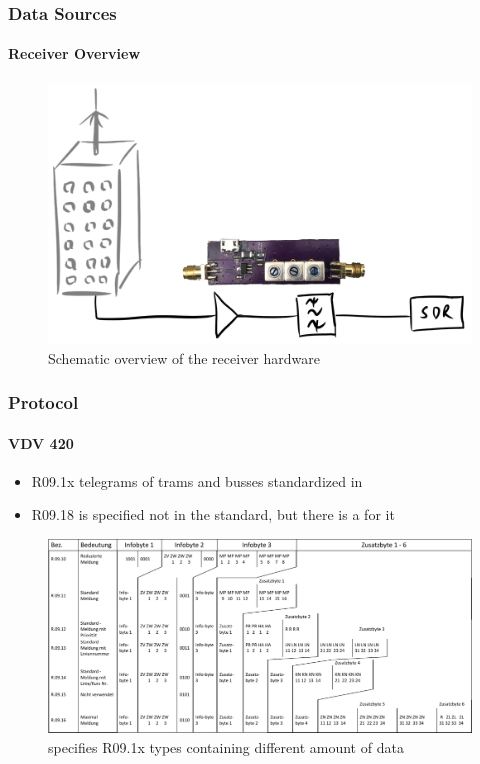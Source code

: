 
\begin{frame}
\frametitle{Data Sources}
\framesubtitle{Receiver Overview}
\begin{figure}
\centering
\includegraphics[height=0.65\textheight]{figs/antenna-filter.pdf}
\caption{Schematic overview of the receiver hardware}
\end{figure}
\end{frame}


\begin{frame}
\frametitle{Protocol}
\framesubtitle{VDV 420}
	\begin{itemize}
		\item R09.1x telegrams of trams and busses standardized in 
		\item R09.18 is specified not in the standard, but there is a  for it
	\end{itemize}
\begin{figure}
\centering
\includegraphics[width=.8\textwidth]{figs/vdv426-r09-variants.pdf}
\caption{ specifies R09.1x types containing different amount of data}
\end{figure}
\end{frame}


